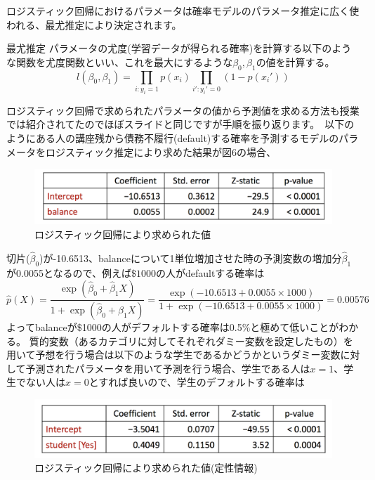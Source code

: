 \documentclass[uplatex]{jsarticle}
\begin{document}
ロジスティック回帰におけるパラメータは確率モデルのパラメータ推定に広く使われる、最尤推定により決定されます。
\begin{itembox}[l]{最尤推定}
  パラメータの尤度(学習データが得られる確率)を計算する以下のような関数を尤度関数といい、これを最大にするような$\beta_0, \beta_1$の値を計算する。
  $$l(\beta_0, \beta_1) = \prod_{i:y_i = 1}p(x_i)\prod_{i':y_i' = 0}(1 - p(x_i'))$$
\end{itembox}
ロジスティック回帰で求められたパラメータの値から予測値を求める方法も授業では紹介されてたのでほぼスライドと同じですが手順を振り返ります。\
以下のようにある人の講座残から債務不履行(default)する確率を予測するモデルのパラメータをロジスティック推定により求めた結果が図6の場合、
\begin{figure}
  \begin{center}
    \includegraphics[width=13cm]{img/logit.png}
    \caption{ロジスティック回帰により求められた値}
  \end{center}
\end{figure}
切片($\hat{\beta}_0$)が-10.6513、balanceについて1単位増加させた時の予測変数の増加分$\hat{\beta}_1$が0.0055となるので、例えば$\$ 1000$の人がdefaultする確率は
$$\hat{p}(X) = \frac{\exp{(\hat{\beta}_0 + \hat{\beta}_1 X)}}{1 + \exp{(\hat{\beta}_0 + \hat{\beta}_1 X)}} = \frac{\exp{(-10.6513 + 0.0055 \times 1000)}}{1 + \exp{(-10.6513 + 0.0055 \times 1000)}} = 0.00576$$
よってbalanceが$\$$1000の人がデフォルトする確率は0.5$\%$と極めて低いことがわかる。
質的変数（あるカテゴリに対してそれぞれダミー変数を設定したもの）を用いて予想を行う場合は以下のような学生であるかどうかというダミー変数に対して予測されたパラメータを用いて予測を行う場合、学生である人は$x = 1$、学生でない人は$x = 0$とすれば良いので、学生のデフォルトする確率は
\begin{figure}
  \begin{center}
    \includegraphics[width=13cm]{img/logit_quali.png}
    \caption{ロジスティック回帰により求められた値(定性情報)}
  \end{center}
\end{figure}
\end{document}

